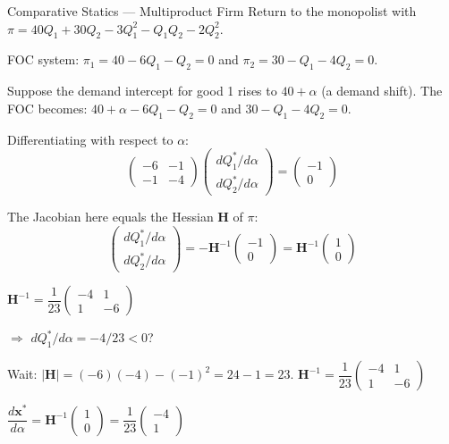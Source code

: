 \documentclass[12pt, a4paper]{article}
\theoremstyle{definition}
\newcommand{\bx}{\mathbf{x}}
\newcommand{\bH}{\mathbf{H}}
\newcommand{\ddd}[2]{\dfrac{d#1}{d#2}}
\begin{document}
\begin{exbox}{Comparative Statics --- Multiproduct Firm}
Return to the monopolist with
$\pi = 40Q_1 + 30Q_2 - 3Q_1^2 - Q_1Q_2 - 2Q_2^2$.

FOC system: $\pi_1 = 40-6Q_1-Q_2=0$ and $\pi_2 = 30-Q_1-4Q_2=0$.

Suppose the demand intercept for good 1 rises to $40+\alpha$ (a demand
shift). The FOC becomes:
$40+\alpha-6Q_1-Q_2=0$ and $30-Q_1-4Q_2=0$.

Differentiating with respect to $\alpha$:
\[
  \begin{pmatrix}-6 & -1\\ -1 & -4\end{pmatrix}
  \begin{pmatrix}dQ_1^*/d\alpha\\ dQ_2^*/d\alpha\end{pmatrix}
  = \begin{pmatrix}-1\\ 0\end{pmatrix}
\]

The Jacobian here equals the Hessian $\bH$ of $\pi$:
\[
  \begin{pmatrix}dQ_1^*/d\alpha\\ dQ_2^*/d\alpha\end{pmatrix}
  = -\bH^{-1}\begin{pmatrix}-1\\0\end{pmatrix}
  = \bH^{-1}\begin{pmatrix}1\\0\end{pmatrix}
\]

$\bH^{-1} = \dfrac{1}{23}\begin{pmatrix}-4 & 1\\ 1 & -6\end{pmatrix}$

$\Rightarrow$ $dQ_1^*/d\alpha = -4/23 < 0$?

Wait: $|\bH| = (-6)(-4)-(-1)^2 = 24-1=23$.
$\bH^{-1} = \dfrac{1}{23}\begin{pmatrix}-4 & 1\\ 1 & -6\end{pmatrix}$

$\ddd{\bx^*}{\alpha} = \bH^{-1}\begin{pmatrix}1\\0\end{pmatrix}
= \dfrac{1}{23}\begin{pmatrix}-4\\1\end{pmatrix}$


\end{exbox}
\end{document}
